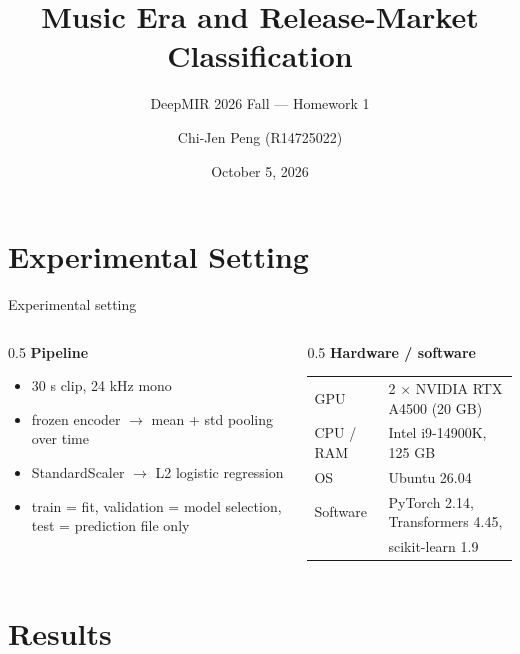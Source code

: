 \documentclass[aspectratio=169,11pt]{beamer}
\title{Music Era and Release-Market Classification}
\subtitle{DeepMIR 2026 Fall --- Homework 1}
\author{Chi-Jen Peng \quad (R14725022)}
\institute{Code, final checkpoints, README: \url{https://github.com/chijenpeng/26-fall-DeepMIR-HW1}\\[0.3em]
Ablation checkpoints (release): \url{https://github.com/chijenpeng/26-fall-DeepMIR-HW1/releases/tag/checkpoints-v1}}
\date{October 5, 2026}
\begin{document}
\maketitle

\section{Experimental Setting}
\begin{frame}{Experimental setting}
  \begin{columns}[T]
    \begin{column}{0.5\textwidth}
      \textbf{Pipeline}
      \begin{itemize}
        \item 30 s clip, 24 kHz mono
        \item frozen encoder $\rightarrow$ mean + std pooling over time
        \item StandardScaler $\rightarrow$ L2 logistic regression
        \item train = fit, validation = model selection, test = prediction file only
      \end{itemize}
    \end{column}
    \begin{column}{0.5\textwidth}
      \textbf{Hardware / software}\\[0.3em]
      {\small
      \begin{tabular}{@{}ll@{}}
        \toprule
        GPU & 2 $\times$ NVIDIA RTX A4500 (20 GB) \\
        CPU / RAM & Intel i9-14900K, 125 GB \\
        OS & Ubuntu 26.04 \\
        Software & PyTorch 2.14, Transformers 4.45,\\ & scikit-learn 1.9 \\
        \bottomrule
      \end{tabular}}
    \end{column}
  \end{columns}
\end{frame}

\section{Results}
\end{document}
